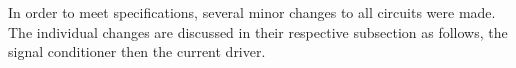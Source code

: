 In order to meet specifications, several minor changes to all circuits were made. The individual changes are discussed in their respective subsection as follows, the signal conditioner then the current driver.


%



